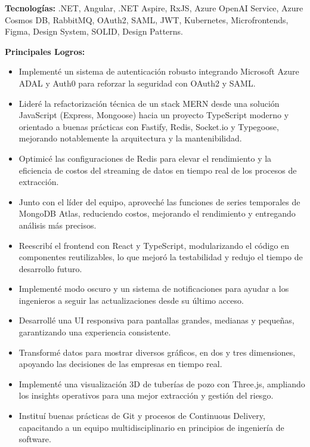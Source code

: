 \documentclass[10pt,a4paper]{altacv}
\begin{document}
\textbf{Tecnologías:} .NET, Angular, .NET Aspire, RxJS, Azure OpenAI Service, Azure Cosmos DB, RabbitMQ, OAuth2, SAML, JWT, Kubernetes, Microfrontends, Figma, Design System, SOLID, Design Patterns.


\break
\newpage
{}


\textbf{Principales Logros:}
\begin{itemize}
\setlength{\itemindent}{0.5em}
\item[--] Implementé un sistema de autenticación robusto integrando Microsoft Azure ADAL y Auth0 para reforzar la seguridad con OAuth2 y SAML.
\item[--] Lideré la refactorización técnica de un stack MERN desde una solución JavaScript (Express, Mongoose) hacia un proyecto TypeScript moderno y orientado a buenas prácticas con Fastify, Redis, Socket.io y Typegoose, mejorando notablemente la arquitectura y la mantenibilidad.
\item[--] Optimicé las configuraciones de Redis para elevar el rendimiento y la eficiencia de costos del streaming de datos en tiempo real de los procesos de extracción.
\item[--] Junto con el líder del equipo, aproveché las funciones de series temporales de MongoDB Atlas, reduciendo costos, mejorando el rendimiento y entregando análisis más precisos.
\item[--] Reescribí el frontend con React y TypeScript, modularizando el código en componentes reutilizables, lo que mejoró la testabilidad y redujo el tiempo de desarrollo futuro.
\item[--] Implementé modo oscuro y un sistema de notificaciones para ayudar a los ingenieros a seguir las actualizaciones desde su último acceso.
\item[--] Desarrollé una UI responsiva para pantallas grandes, medianas y pequeñas, garantizando una experiencia consistente.
\item[--] Transformé datos para mostrar diversos gráficos, en dos y tres dimensiones, apoyando las decisiones de las empresas en tiempo real.
\item[--] Implementé una visualización 3D de tuberías de pozo con Three.js, ampliando los insights operativos para una mejor extracción y gestión del riesgo.
\item[--] Instituí buenas prácticas de Git y procesos de Continuous Delivery, capacitando a un equipo multidisciplinario en principios de ingeniería de software.
\end{itemize}
\end{document}
